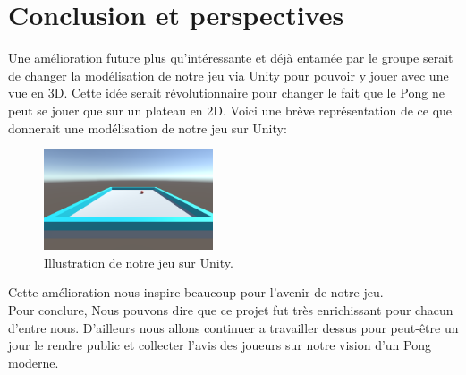 \chapter*{Conclusion et perspectives}
\label{sec:conclusion}


Une amélioration future plus qu'intéressante et déjà entamée par le groupe serait de changer la modélisation de notre jeu via Unity pour pouvoir y jouer avec une vue en 3D. Cette idée serait révolutionnaire pour changer le fait que le Pong ne peut se jouer que sur un plateau en 2D. Voici une brève représentation de ce que donnerait une modélisation de notre jeu sur Unity:

\begin{figure}[ht]
  \centering
  \includegraphics[width=5cm]{images/Capture12}
  \caption{Illustration de notre jeu sur Unity.}
  \label{fig:une-image}
\end{figure}

Cette amélioration nous inspire beaucoup pour l'avenir de notre jeu.\\
Pour conclure, Nous pouvons dire que ce projet fut très enrichissant pour chacun d'entre nous. D'ailleurs nous allons continuer a travailler dessus pour peut-être un jour le rendre public et collecter l'avis des joueurs sur notre vision d'un Pong moderne.